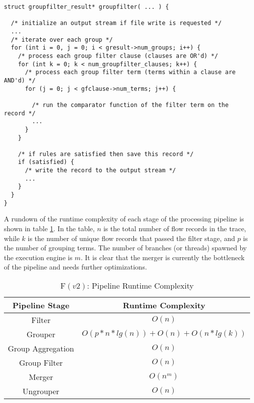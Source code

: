 \begin{lstlisting}
struct groupfilter_result* groupfilter( ... ) {

  /* initialize an output stream if file write is requested */
  ...
  /* iterate over each group */
  for (int i = 0, j = 0; i < gresult->num_groups; i++) {
    /* process each group filter clause (clauses are OR'd) */
    for (int k = 0; k < num_groupfilter_clauses; k++) {
      /* process each group filter term (terms within a clause are AND'd) */
      for (j = 0; j < gfclause->num_terms; j++) {

        /* run the comparator function of the filter term on the record */
        ...
      }
    }

    /* if rules are satisfied then save this record */
    if (satisfied) {
      /* write the record to the output stream */
      ...
    }
  }
}
\end{lstlisting}


A rundown of the runtime complexity of each stage of the processing pipeline
is shown in table \ref{tab:fv2-pipeline-complexity}. In the table, $n$ is the
total number of flow records   in the trace,
while $k$ is the number of unique flow records that passed the filter stage,
and $p$ is the number of grouping terms. The number of branches (or threads)
spawned by the execution engine is $m$. It is clear that the merger is
currently the bottleneck of the pipeline and needs further optimizations.

\begin{table}[h!]
	\begin{center}
		\begin{tabular}{|c|c|}
		\hline
		Pipeline Stage & Runtime Complexity \\
		\hline
		\hline
		Filter & $O(n)$ \\
		\hline
		Grouper & $O(p*n*lg(n)) + O(n) + O(n*lg(k))$ \\
		\hline
		Group Aggregation & $O(n)$ \\
		\hline
		Group Filter & $O(n)$ \\
		\hline
		Merger & $O(n^m)$ \\
		\hline
		Ungrouper & $O(n)$ \\
		\hline
		\end{tabular}
\caption{F$(v2)$: Pipeline Runtime Complexity}
\label{tab:fv2-pipeline-complexity}
	\end{center}
\end{table}
